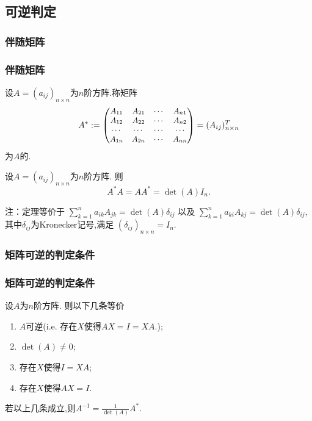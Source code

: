 \subsection{可逆判定}


\subsubsection{伴随矩阵}
\begin{frame}\frametitle{伴随矩阵}
\pp
\begin{definition}[伴随矩阵]
设$A=(a_{ij})_{n\times n}$为$n$阶方阵.称矩阵
\[\small A^*:=\begin{pmatrix}
A_{11}&A_{21}&\cdots&A_{n1}\\
A_{12}&A_{22}&\cdots&A_{n2}\\
\cdots&\cdots&\cdots&\cdots\\
A_{1n}&A_{2n}&\cdots&A_{nn}\\
\end{pmatrix}=(A_{ij})_{n\times n}^T\]
为$A$的.
\end{definition}
\pp
\begin{theorem}
设$A=(a_{ij})_{n\times n}$为$n$阶方阵. 则
\[A^*A=AA^*=\det(A)I_n.\]
\end{theorem}
\pp
注：定理等价于 $\sum\limits_{k=1}^{n}a_{ik}A_{jk}=\det(A)\delta_{ij}$ 以及 $\sum\limits_{k=1}^{n}a_{ki}A_{kj}=\det(A)\delta_{ij}$, 其中$\delta_{ij}$为Kronecker记号,满足 $(\delta_{ij})_{n\times n}=I_n$.

\end{frame}





\subsubsection{矩阵可逆的判定条件}
\begin{frame}\frametitle{矩阵可逆的判定条件}
\begin{theorem}
设$A$为$n$阶方阵. 则以下几条等价 \pp
\begin{enumerate}
\item $A$可逆(i.e. 存在$X$使得$AX=I=XA$.); \pp
\item $\det(A)\neq0$; \pp
\item 存在$X$使得$I=XA$; \pp
\item 存在$X$使得$AX=I$.
\end{enumerate}
\pp
若以上几条成立,则$A^{-1}=\frac1{\det(A)}A^*$.
\end{theorem}
\end{frame}



